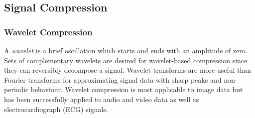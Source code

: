 \subsection{Signal Compression}

\subsubsection{Wavelet Compression}

A \textit{wavelet} is a brief oscillation which starts and ends with an amplitude of zero. Sets of complementary wavelets are desired for wavelet-based compression since they can reversibly decompose a signal. Wavelet transforms are more useful than Fourier transforms for approximating signal data with sharp peaks and non-periodic behaviour. Wavelet compression is most applicable to image data but has been successfully applied to audio and video data as well as electrocardiograph (ECG) signals.
